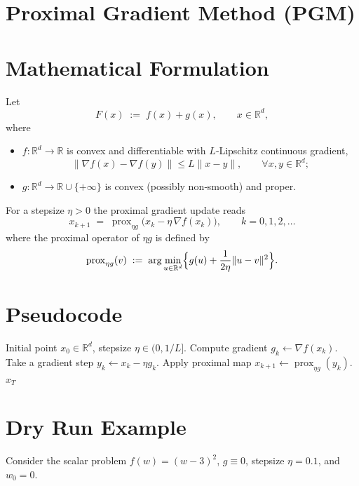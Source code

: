 \documentclass{article}
\newcommand{\prox}{\operatorname{prox}}
\newcommand{\grad}{\nabla}
\newcommand{\R}{\mathbb{R}}
\begin{document}
\section*{Proximal Gradient Method (PGM)}

\section*{Mathematical Formulation}
Let 
\[
F(x)\;:=\;f(x)+g(x),\qquad x\in\R^{d},
\]
where  

\begin{itemize}
  \item $f:\R^{d}\rightarrow\R$ is convex and differentiable with $L$‑Lipschitz continuous gradient,
        \[
        \|\grad f(x)-\grad f(y)\|\le L\|x-y\|,\qquad\forall x,y\in\R^{d};
        \]
  \item $g:\R^{d}\rightarrow\R\cup\{+\infty\}$ is convex (possibly non‑smooth) and proper.
\end{itemize}
For a stepsize $\eta>0$ the proximal gradient update reads
\begin{equation}
\label{eq:update}
x_{k+1}\;=\;\prox_{\eta g}\!\bigl(x_{k}-\eta\,\grad f(x_{k})\bigr),
\qquad k=0,1,2,\dots
\end{equation}
where the proximal operator of $\eta g$ is defined by
\[
\prox_{\eta g}(v)\;:=\;\arg\min_{u\in\R^{d}}\Bigl\{g(u)+\frac{1}{2\eta}\|u-v\|^{2}\Bigr\}.
\]

\section*{Pseudocode}
\begin{algorithm}[H]
\caption{Proximal Gradient Method}
\begin{algorithmic}[1]
\REQUIRE Initial point $x_{0}\in\R^{d}$, stepsize $\eta\in(0,1/L]$.
    \STATE Compute gradient $g_{k}\gets \grad f(x_{k})$.
    \STATE Take a gradient step $y_{k}\gets x_{k}-\eta g_{k}$.
    \STATE Apply proximal map $x_{k+1}\gets \prox_{\eta g}(y_{k})$.
\ENDFOR
\RETURN $x_{T}$
\end{algorithmic}
\end{algorithm}

\section*{Dry Run Example}
Consider the scalar problem $f(w)=(w-3)^{2}$, $g\equiv0$, stepsize $\eta=0.1$, and $w_{0}=0$.
\end{document}
